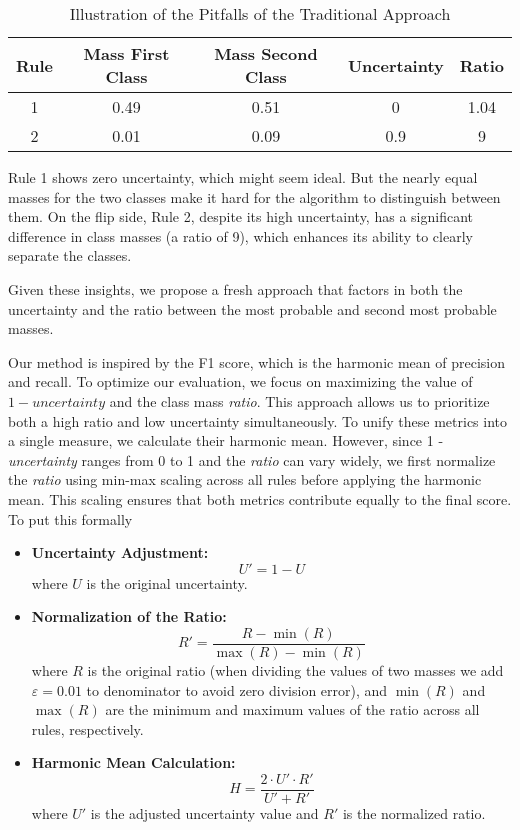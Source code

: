 \documentclass[10pt,a4paper,oneside]{article}
\begin{document}
\begin{table}[ht]
    \centering
    \caption{Illustration of the Pitfalls of the Traditional Approach}
    \label{table-pitfalls}
    \begin{tabular}{c|c|c|c|c}
        \toprule
        \textbf{Rule} & \textbf{Mass First Class} & \textbf{Mass Second Class} & \textbf{Uncertainty} & \textbf{Ratio} \\
        \midrule
        1 & 0.49 & 0.51 & 0 & 1.04 \\
        2 & 0.01 & 0.09 & 0.9 & 9 \\
        \bottomrule
    \end{tabular}

\end{table}
Rule 1 shows zero uncertainty, which might seem ideal. But the nearly equal masses for the two classes make it hard for the algorithm to distinguish between them. On the flip side, Rule 2, despite its high uncertainty, has a significant difference in class masses (a ratio of 9), which enhances its ability to clearly separate the classes.

Given these insights, we propose a fresh approach that factors in both the uncertainty and the ratio between the most probable and second most probable masses.

Our method is inspired by the F1 score, which is the harmonic mean of precision and recall. To optimize our evaluation, we focus on maximizing the value of $1 - \textit{uncertainty}$ and the class mass \textit{ratio}. This approach allows us to prioritize both a high ratio and low uncertainty simultaneously. To unify these metrics into a single measure, we calculate their harmonic mean. However, since 1 - \textit{uncertainty} ranges from 0 to 1 and the \textit{ratio} can vary widely, we first normalize the \textit{ratio} using min-max scaling across all rules before applying the harmonic mean. This scaling ensures that both metrics contribute equally to the final score.
To put this formally 
\begin{itemize}
    \item \textbf{Uncertainty Adjustment:}
    \[
    U' = 1 - U
    \]
    where \( U \) is the original uncertainty.

    \item \textbf{Normalization of the Ratio:}
    \[
    R' = \frac{R - \min(R)}{\max(R) - \min(R)}
    \]
    where \( R \) is the original ratio (when dividing the values of two masses we add $\varepsilon=0.01$ to denominator to avoid zero division error), and \( \min(R) \) and \( \max(R) \) are the minimum and maximum values of the ratio across all rules, respectively.

    \item \textbf{Harmonic Mean Calculation:}
    \[
    H = \frac{2 \cdot U' \cdot R'}{U' + R'}
    \]
    where \( U' \) is the adjusted uncertainty value and \( R' \) is the normalized ratio.
\end{itemize}
\end{document}
